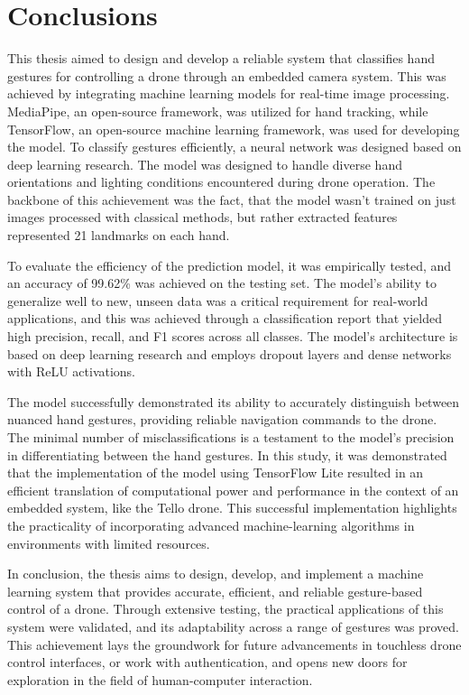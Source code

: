 \chapter{Conclusions}
This thesis aimed to design and develop a reliable system that classifies hand gestures for controlling a drone through an embedded camera system. This was achieved by integrating machine learning models for real-time image processing. MediaPipe, an open-source framework, was utilized for hand tracking, while TensorFlow, an open-source machine learning framework, was used for developing the model. To classify gestures efficiently, a neural network was designed based on deep learning research. The model was designed to handle diverse hand orientations and lighting conditions encountered during drone operation. The backbone of this achievement was the fact, that the model wasn't trained on just images processed with classical methods, but rather extracted features represented 21 landmarks on each hand.

To evaluate the efficiency of the prediction model, it was empirically tested, and an accuracy of 99.62\% was achieved on the testing set. The model's ability to generalize well to new, unseen data was a critical requirement for real-world applications, and this was achieved through a classification report that yielded high precision, recall, and F1 scores across all classes. The model's architecture is based on deep learning research and employs dropout layers and dense networks with ReLU activations.

The model successfully demonstrated its ability to accurately distinguish between nuanced hand gestures, providing reliable navigation commands to the drone. The minimal number of misclassifications is a testament to the model's precision in differentiating between the hand gestures.
In this study, it was demonstrated that the implementation of the model using TensorFlow Lite resulted in an efficient translation of computational power and performance in the context of an embedded system, like the Tello drone. This successful implementation highlights the practicality of incorporating advanced machine-learning algorithms in environments with limited resources. 

In conclusion, the thesis aims to design, develop, and implement a machine learning system that provides accurate, efficient, and reliable gesture-based control of a drone. Through extensive testing, the practical applications of this system were validated, and its adaptability across a range of gestures was proved. This achievement lays the groundwork for future advancements in touchless drone control interfaces, or work with authentication, and opens new doors for exploration in the field of human-computer interaction.
\clearpage